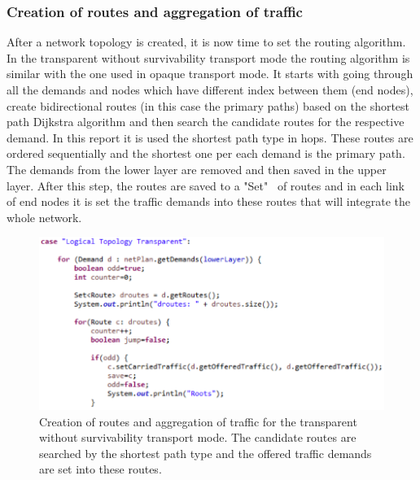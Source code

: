 \subsubsection{Creation of routes and aggregation of traffic}

\vspace{11pt}
After a network topology is created, it is now time to set the routing algorithm. In the transparent without survivability transport mode the routing algorithm is similar with the one used in opaque transport mode. It starts with going through all the demands and nodes which have different index between them (end nodes), create bidirectional routes (in this case the primary paths) based on the shortest path Dijkstra algorithm and then search the candidate routes for the respective demand. In this report it is used the shortest path type in hops. These routes are ordered sequentially and the shortest one per each demand is the primary path. The demands from the lower layer are removed and then saved in the upper layer. After this step, the routes are saved to a "Set" \ of routes and in each link of end nodes it is set the traffic demands into these routes that will integrate the whole network.

\begin{figure}[H]
\centering
\includegraphics[width=14cm]{sdf/heuristic/transparent_survivability/figures/grooming_transparent_surv1}
\caption{Creation of routes and aggregation of traffic for the transparent without survivability transport mode. The candidate routes are searched by the shortest path type and the offered traffic demands are set into these routes.}
\label{grooming_transparent_surv1}
\end{figure}

